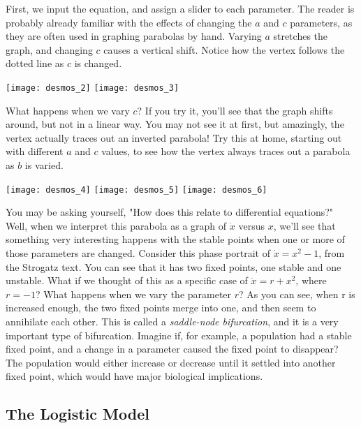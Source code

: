 \documentclass[a5paper]{article}
\theoremstyle{definition}%
\numberwithin{exercise}{section}
\theoremstyle{remark}%
\begin{document}
\noindent First, we input the equation, and assign a slider to each parameter. 
The reader is probably already familiar with the effects of changing the $a$ and $c$ parameters, as they are often used in graphing parabolas by hand. Varying $a$ stretches the graph, and changing $c$ causes a vertical shift. Notice how the vertex follows the dotted line as $c$ is changed. 
\begin{center}
\texttt{[image: desmos\_2]}
\texttt{[image: desmos\_3]}
\end{center}
What happens when we vary $c$? If you try it, you'll see that the graph shifts around, but not in a linear way. You may not see it at first, but amazingly, the vertex actually traces out an inverted parabola! Try this at home, starting out with different $a$ and $c$ values, to see how the vertex always traces out a parabola as $b$ is varied. 
\begin{center}
\texttt{[image: desmos\_4]}
\texttt{[image: desmos\_5]}
\texttt{[image: desmos\_6]}
\end{center}
You may be asking yourself, "How does this relate to differential equations?" Well, when we interpret this parabola as a graph of $\dot{x}$ versus $x$, we'll see that something very interesting happens with the stable points when one or more of those parameters are changed. Consider this phase portrait of $\dot{x}=x^2-1$, from the Strogatz text. 
You can see that it has two fixed points, one stable and one unstable. What if we thought of this as a specific case of $\dot{x}=r+x^2$, where $r=-1$? What happens when we vary the parameter $r$?
As you can see, when r is increased enough, the two fixed points merge into one, and then seem to annihilate each other. This is called a \emph{saddle-node bifurcation}, and it is a very important type of bifurcation. Imagine if, for example, a population had a stable fixed point, and a change in a parameter caused the fixed point to disappear? The population would either increase or decrease until it settled into another fixed point, which would have major biological implications. 

\subsection{The Logistic Model}
\end{document}

